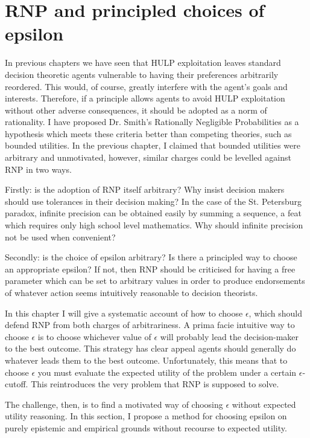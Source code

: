 \documentclass{article}
\begin{document}
\section{RNP and principled choices of epsilon}

In previous chapters we have seen that HULP exploitation leaves standard decision theoretic agents vulnerable to having their preferences arbitrarily reordered. This would, of course, greatly interfere with the agent's goals and interests. Therefore, if a principle allows agents to avoid HULP exploitation without other adverse consequences, it should be adopted as a norm of rationality. I have proposed Dr. Smith's Rationally Negligible Probabilities as a hypothesis which meets these criteria better than competing theories, such as bounded utilities. In the previous chapter, I claimed that bounded utilities were arbitrary and unmotivated, however, similar charges could be levelled against RNP in two ways.

Firstly: is the adoption of RNP itself arbitrary? Why insist decision makers should use tolerances in their decision making? In the case of the St. Petersburg paradox, infinite precision can be obtained easily by summing a sequence, a feat which requires only high school level mathematics. Why should infinite precision not be used when convenient?

Secondly: is the choice of epsilon arbitrary? Is there a principled way to choose an appropriate epsilon? If not, then RNP should be criticised for having a free parameter which can be set to arbitrary values in order to produce endorsements of whatever action seems intuitively reasonable to decision theorists. 

In this chapter I will give a systematic account of how to choose \(\epsilon\), which should defend RNP from both charges of arbitrariness. A prima facie intuitive way to choose \(\epsilon\) is to choose whichever value of \(\epsilon\) will probably lead the decision-maker to the best outcome. This strategy has clear appeal \textemdash{} agents should generally do whatever leads them to the best outcome. Unfortunately, this means that to choose \(\epsilon\) you must evaluate the expected utility of the problem under a certain \(\epsilon\)-cutoff. This reintroduces the very problem that RNP is supposed to solve. 

The challenge, then, is to find a motivated way of choosing \(\epsilon\) without expected utility reasoning. In this section, I propose a method for choosing epsilon on purely epistemic and empirical grounds without recourse to expected utility. 
\end{document}
